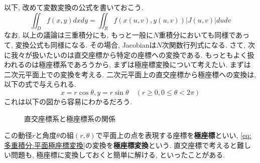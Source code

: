         以下, 改めて変数変換の公式を書いておこう.
        \begin{equation}
            \iint_D f(x,y)dxdy = \iint_R f(x(u,v),y(u,v))|J(u,v)|dudv \label{eq:多重積分:変数変換の公式}
        \end{equation}
        なお, 以上の議論は三重積分にも, もっと一般に$N$重積分においても同様であって, 変換公式も同様になる. その場合, Jacobianは$N$次関数行列式になる.
        \clearpage
        さて, 次に我々が扱いたいのは直交座標から特定の座標への変換である. もっともよく扱われるのは極座標系であろうから, まずは極座標変換について考えたい. まずは二次元平面上での変換を考える.
        二次元平面上の直交座標から極座標への変換は, 以下の式で与えられる.
        \begin{equation}
            x=r\cos\theta, y=r\sin\theta \quad (r\geq 0,0\leq \theta<2\pi) \label{eq:多重積分:平面極座標変換}
        \end{equation}
        これは以下の図から容易にわかるだろう.
        \begin{figure}[h]
            \centering
            \caption{直交座標系と極座標系の関係}
        \end{figure}

        この動径$r$と角度$\theta$の組$(r,\theta)$で平面上の点を表現する座標を\textbf{極座標}といい, 
        \eqref{eq:多重積分:平面極座標変換}の変換を\textbf{極座標変換}という. 直交座標で考えると難しい問題も,
        極座標に変換しておくと簡単に解ける, といったことがある. 

